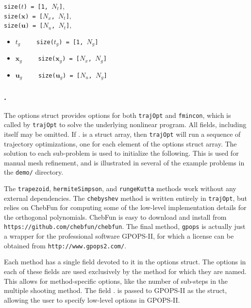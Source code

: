 \texttt{size($t$) = [1, $N_t$]}, \\
\texttt{size($\bm{x}$) = [$N_x$, $N_t$]}, \\
\texttt{size($\bm{u}$) = [$N_u$, $N_t$]}, \\

\begin{itemize} \setlength\itemsep{-0.1em}
\item {}\tc{ = }$t_g \qquad$ \texttt{size($t_g$) = [1, $N_g$]}   
\item {}\tc{ = }$\bm{x}_g \qquad$ \texttt{size($\bm{x}_g$) = [$N_x$, $N_g$]}  
\item {}\tc{ = }$\bm{u}_g \qquad$ \texttt{size($\bm{u}_g$) = [$N_u$, $N_g$]}
\end{itemize}


\subsubsection*{.}

The options struct provides options for both \texttt{trajOpt} and \texttt{fmincon}, which is called by \texttt{trajOpt} to solve the underlying nonlinear program. All fields, including  itself may be omitted. If . is a struct array, then \texttt{trajOpt} will run a sequence of trajectory optimizations, one for each element of the options struct array. The solution to each sub-problem is used to initialize the following. This is used for manual mesh refinement, and is illustrated in several of the example problems in the \texttt{demo/} directory. 

\par The \texttt{trapezoid}, \texttt{hermiteSimpson}, and \texttt{rungeKutta} methods work without any external dependencies. The \texttt{chebyshev} method is written entirely in \texttt{trajOpt}, but relies on ChebFun\cite{Driscoll2014} for computing some of the low-level implementation details for the orthogonal polynomials. ChebFun is easy to download and install from \texttt{https://github.com/chebfun/chebfun}. The final method, \texttt{gpops} is actually just a wrapper for the professional software GPOPS-II\cite{Patterson2013}, for which a license can be obtained from \texttt{http://www.gpops2.com/}.

\par Each method has a single field devoted to it in the options struct. The options in each of these fields are used exclusively by the method for which they are named. This allows for method-specific options, like the number of sub-steps in the multiple shooting method. The field . is passed to GPOPS-II as the  struct, allowing the user to specify low-level options in GPOPS-II. 

